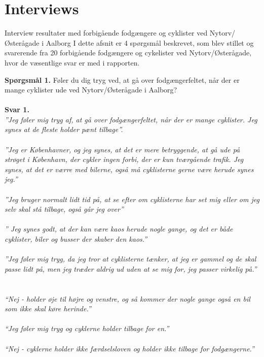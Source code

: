 \appendix
\label{appendix_start}
\chapter{Interviews}
  \label{chap:interviews}
Interview resultater med forbigående fodgængere og cyklister ved Nytorv/Østerågade i Aalborg I dette afsnit er 4 spørgsmål beskrevet, som blev stillet og svarerende fra 20 forbigående fodgængere og cykelister ved Nytorv/Østerågade, hvor de væsentlige svar er med i rapporten.

  \textbf{Spørgsmål 1.}
  Føler du dig tryg ved, at gå over fodgængerfeltet, når der er mange cyklister ude ved Nytorv/Østerågade i Aalborg?
~\\\\
  \textbf{Svar 1.} ~\\
 \emph{”Jeg føler mig tryg af, at gå over fodgængerfeltet, når der er mange cyklister. Jeg synes at de fleste holder pænt tilbage”.}
~\\\\
  \emph{”Jeg er Københavner, og jeg synes, at det er mere betryggende, at gå ude på strøget i København, der cykler ingen forbi, der er kun tværgående trafik. Jeg synes, at det er værre med bilerne, også må cyklisterne gerne være herude synes jeg.”}
~\\\\
  \emph{”Jeg bruger normalt lidt tid på, at se efter om cyklisterne har set mig eller om jeg selv skal stå tilbage, også går jeg over”}
~\\\\
\emph{” Jeg synes godt, at der kan være kaos herude nogle gange, og det er både cyklister, biler og busser der skaber den kaos.”}
~\\\\
  \emph{”Jeg føler mig tryg, da jeg tror at cyklisterne tænker, at jeg er gammel og de skal passe lidt på, men jeg træder aldrig ud uden at se mig for, jeg passer virkelig på.”}
~\\\\
  \emph{“Nej - holder øje til højre og venstre, og så kommer der nogle gange også en bil som ikke skal køre herinde.”}
~\\\\
  \emph{“Jeg føler mig tryg og cyklerne holder tilbage for en.”}
~\\\\
  \emph{“Nej - cyklerne holder ikke færdselsloven og holder ikke tilbage for fodgængerne.”}
~\\\\
